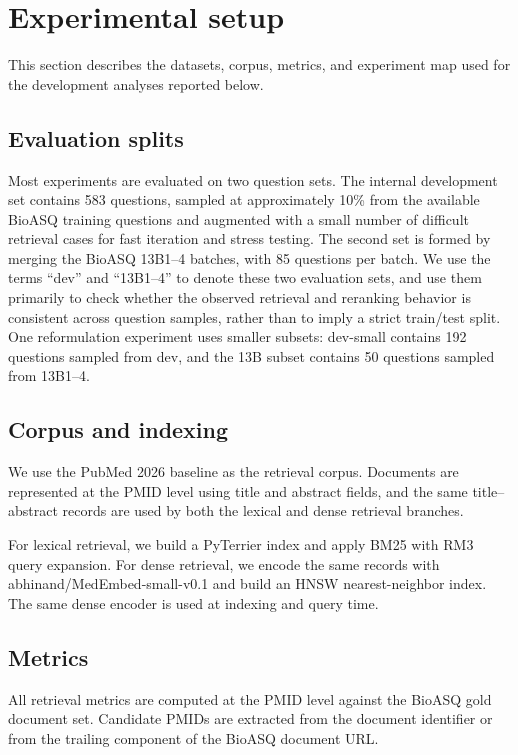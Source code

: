 \documentclass[
]{ceurart}
\begin{document}
\section{Experimental setup}

This section describes the datasets, corpus, metrics, and experiment map used for the development analyses reported below.

\subsection{Evaluation splits}

Most experiments are evaluated on two question sets. The internal development set contains 583 questions, sampled at approximately 10\% from the available BioASQ training questions and augmented with a small number of difficult retrieval cases for fast iteration and stress testing. The second set is formed by merging the BioASQ 13B1--4 batches, with 85 questions per batch. We use the terms ``dev'' and ``13B1--4'' to denote these two evaluation sets, and use them primarily to check whether the observed retrieval and reranking behavior is consistent across question samples, rather than to imply a strict train/test split. One reformulation experiment uses smaller subsets: dev-small contains 192 questions sampled from dev, and the 13B subset contains 50 questions sampled from 13B1--4.

\subsection{Corpus and indexing}

We use the PubMed 2026 baseline as the retrieval corpus. Documents are represented at the PMID level using title and abstract fields, and the same title--abstract records are used by both the lexical and dense retrieval branches.

For lexical retrieval, we build a PyTerrier \cite{macdonald2021pyterrier} index and apply BM25 with RM3 query expansion. For dense retrieval, we encode the same records with abhinand/MedEmbed-small-v0.1 and build an HNSW nearest-neighbor index. The same dense encoder is used at indexing and query time.

\subsection{Metrics}

All retrieval metrics are computed at the PMID level against the BioASQ gold document set. Candidate PMIDs are extracted from the document identifier or from the trailing component of the BioASQ document URL.
\end{document}
